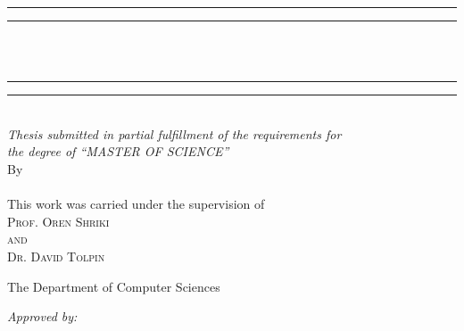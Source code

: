 \begin{center}
\vspace*{3mm}
\rule[0.5ex]{\linewidth}{2pt}\vspace*{-\baselineskip}\vspace*{3.2pt}
\rule[0.5ex]{\linewidth}{1pt}\\
[\baselineskip]{\Huge \thesisTitle}\\[3mm]
\rule[0.5ex]{\linewidth}{1pt}\vspace*{-\baselineskip}\vspace{3.2pt}
\rule[0.5ex]{\linewidth}{3pt}\\
\vspace*{5mm}
{\large \textit{Thesis submitted in partial fulfillment of the requirements for \\ [2mm]
the degree of \enquote{MASTER OF SCIENCE}
}}\\
\vspace{6.5mm}
{\large By}\\
\vspace{2.5mm}
{\large\textsc{\thesisAuthor}}\\
\vspace{6.5mm}
{\large This work was carried under the supervision of}\\
\vspace{2.5mm}
{\large\textsc{Prof. Oren Shriki}}\\
\vspace{2.5mm}
{\large\textsc{and}}\\
\vspace{2.5mm}
{\large\textsc{Dr. David Tolpin}}\\
\vspace{6.5mm}

{\large The Department of Computer Sciences
}\\
\vspace{8mm}

\begin{minipage}{10cm}
\textit{Approved by:}
\vspace{1em}
\begin{center}


\end{center}
\end{minipage}
\end{center}

